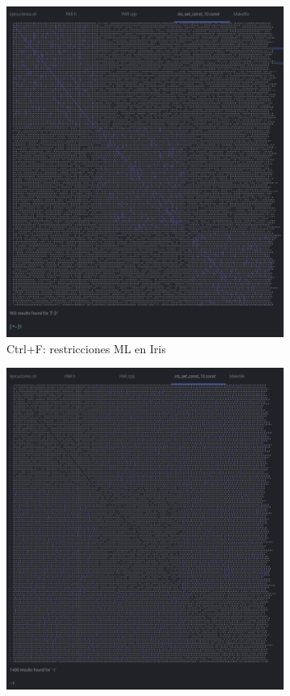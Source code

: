 \documentclass[12pt, spanish]{article}
\begin{document}
\begin{figure}[H]
  \centering
  \begin{subfigure}[b]{0.45\textwidth}
      \includegraphics[scale = 0.30]{rest_iris_10.png}
 		 \caption{Ctrl+F: restricciones ML en Iris}
  		\label{fig:rest_iris_10_1}
  \end{subfigure}
  \hfill
  \begin{subfigure}[b]{0.5\textwidth}
      \includegraphics[scale = 0.30]{rest_iris_10_-1.png}

\end{subfigure}
\end{figure}
\end{document}
